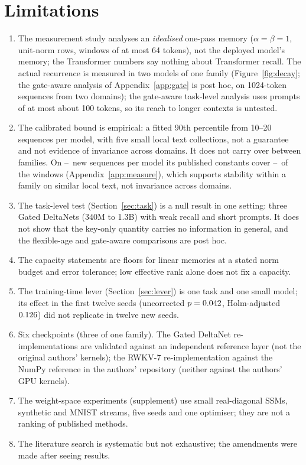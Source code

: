 \documentclass{article}
\begin{document}
\section{Limitations}\label{sec:limits}
\begin{enumerate}
  \item The measurement study analyses an \emph{idealised} one-pass memory ($\alpha=\beta=1$, unit-norm rows, windows of at most 64 tokens), not the deployed model's memory; the Transformer numbers say nothing about Transformer recall. The actual recurrence is measured in two models of one family (Figure~\ref{fig:decay}; the gate-aware analysis of Appendix~\ref{app:gate} is post hoc, on 1024-token sequences from two domains); the gate-aware task-level analysis uses prompts of at most about 100 tokens, so its reach to longer contexts is untested.
  \item The calibrated bound is empirical: a fitted 90th percentile from 10--20 sequences per model, with five small local text collections, not a guarantee and not evidence of invariance across domains. It does not carry over between families. On \heldSeqLo--\heldSeqHi\ new sequences per model its published constants cover \heldCovLo--\heldCovHi\ of the windows (Appendix~\ref{app:measure}), which supports stability within a family on similar local text, not invariance across domains.
  \item The task-level test (Section~\ref{sec:task}) is a null result in one setting: three Gated DeltaNets (340M to 1.3B) with weak recall and short prompts. It does not show that the key-only quantity carries no information in general, and the flexible-age and gate-aware comparisons are post hoc.
  \item The capacity statements are floors for linear memories at a stated norm budget and error tolerance; low effective rank alone does not fix a capacity.
  \item The training-time lever (Section~\ref{sec:lever}) is one task and one small model; its effect in the first twelve seeds (uncorrected $p=0.042$, Holm-adjusted $0.126$) did not replicate in twelve new seeds.
  \item Six checkpoints (three of one family). The Gated DeltaNet re-implementations are validated against an independent reference layer (not the original authors' kernels); the RWKV-7 re-implementation against the NumPy reference in the authors' repository (neither against the authors' GPU kernels).
  \item The weight-space experiments (supplement) use small real-diagonal SSMs, synthetic and MNIST streams, five seeds and one optimiser; they are not a ranking of published methods.
  \item The literature search is systematic but not exhaustive; the amendments were made after seeing results.
\end{enumerate}
\end{document}
